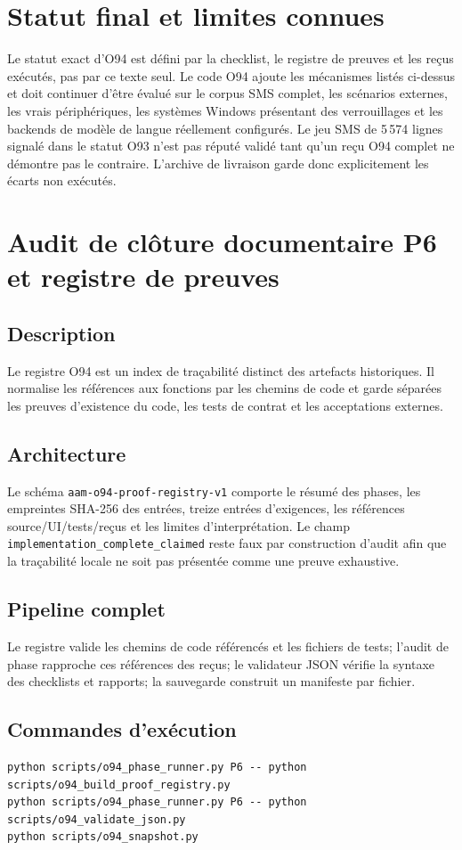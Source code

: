 \documentclass[11pt,a4paper]{article}
\begin{document}
\section{Statut final et limites connues}
Le statut exact d'O94 est défini par la checklist, le registre de preuves et les reçus exécutés, pas par ce texte seul. Le code O94 ajoute les mécanismes listés ci-dessus et doit continuer d'être évalué sur le corpus SMS complet, les scénarios externes, les vrais périphériques, les systèmes Windows présentant des verrouillages et les backends de modèle de langue réellement configurés. Le jeu SMS de 5\,574 lignes signalé dans le statut O93 n'est pas réputé validé tant qu'un reçu O94 complet ne démontre pas le contraire. L'archive de livraison garde donc explicitement les écarts non exécutés.
\section{Audit de clôture documentaire P6 et registre de preuves}
\subsection{Description}
Le registre O94 est un index de traçabilité distinct des artefacts historiques. Il normalise les références aux fonctions par les chemins de code et garde séparées les preuves d’existence du code, les tests de contrat et les acceptations externes.
\subsection{Architecture}
Le schéma \texttt{aam-o94-proof-registry-v1} comporte le résumé des phases, les empreintes SHA-256 des entrées, treize entrées d’exigences, les références source/UI/tests/reçus et les limites d’interprétation. Le champ \texttt{implementation\_complete\_claimed} reste faux par construction d’audit afin que la traçabilité locale ne soit pas présentée comme une preuve exhaustive.
\subsection{Pipeline complet}
Le registre valide les chemins de code référencés et les fichiers de tests; l’audit de phase rapproche ces références des reçus; le validateur JSON vérifie la syntaxe des checklists et rapports; la sauvegarde construit un manifeste par fichier.
\subsection{Commandes d'exécution}
\begin{verbatim}
python scripts/o94_phase_runner.py P6 -- python scripts/o94_build_proof_registry.py
python scripts/o94_phase_runner.py P6 -- python scripts/o94_validate_json.py
python scripts/o94_snapshot.py
\end{verbatim}
\end{document}
